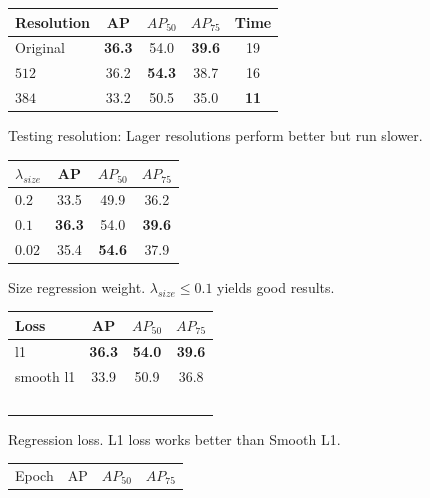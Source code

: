 \documentclass[10pt,twocolumn,letterpaper]{article}
\begin{document}
\begin{table}[t]
\setlength{\tabcolsep}{1.4pt}
\begin{subfigure}[t]{0.28\linewidth}
\centering
\begin{tabular}{l c c c c}
\hline
Resolution & AP & $AP_{50}$ & $AP_{75}$ & Time \\
\hline
Original & \textbf{36.3} & 54.0 & \textbf{39.6} & 19 \\
$512$& 36.2 & \textbf{54.3} & 38.7 & 16 \\
$384$ & 33.2 & 50.5 & 35.0 & \textbf{11} \\
\hline
\end{tabular}
\caption{Testing resolution: Lager resolutions perform better but run slower.} \label{tab:design:resolution}
\end{subfigure}
\hspace{2mm}
\begin{subfigure}[t]{0.23\linewidth}
\centering
\begin{tabular}{l c c c}
\hline
$\lambda_{size}$ & AP & $AP_{50}$ & $AP_{75}$ \\
\hline
$0.2$ & 33.5 & 49.9 & 36.2\\
$0.1$ & \textbf{36.3} & 54.0 & \textbf{39.6} \\
$0.02$ & 35.4 & \textbf{54.6} & 37.9 \\
\hline
\end{tabular}
\caption{Size regression weight. $\!\lambda_{size}\!\le\!0.1$ yields good results.}
\label{tab:design:lossweight}
\end{subfigure}
\hspace{2mm}
\begin{subfigure}[t]{0.23\linewidth}
\centering
\begin{tabular}{l c c c}
\hline
Loss & AP & $AP_{50}$ & $AP_{75}$ \\
\hline
l1 & \textbf{36.3} & \textbf{54.0} & \textbf{39.6} \\
smooth l1 & 33.9 & 50.9 & 36.8 \\
\hline
\multicolumn{4}{c}{~}\\
\end{tabular}
\caption{Regression loss. L1 loss works better than Smooth L1.}
\label{tab:design:regloss}
\end{subfigure}
\hspace{2mm}
\begin{subfigure}[t]{0.2\linewidth}
\centering
\begin{tabular}{l c c c}
\hline
Epoch & AP & $AP_{50}$ & $AP_{75}$ \\

\end{tabular}
\end{subfigure}
\end{table}
\end{document}
